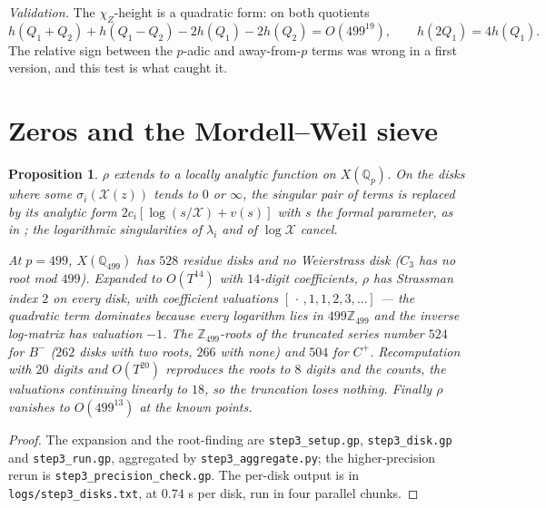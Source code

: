 \documentclass[11pt,reqno]{amsart}
\theoremstyle{plain}
\newtheorem{proposition}[theorem]{Proposition}
\theoremstyle{definition}
\newcommand{\Q}{\mathbb{Q}}
\newcommand{\Z}{\mathbb{Z}}
\numberwithin{equation}{section}
\begin{document}
\emph{Validation.} The $\chi_{Z}$-height is a quadratic form: on both quotients
\[
  h(Q_{1}+Q_{2})+h(Q_{1}-Q_{2})-2h(Q_{1})-2h(Q_{2})=O(499^{19}),
  \qquad h(2Q_{1})=4h(Q_{1}).
\]
The relative sign between the $p$-adic and away-from-$p$ terms was wrong in a
first version, and this test is what caught it.

\section{Zeros and the Mordell--Weil sieve}\label{sec:sieve}

\begin{proposition}\label{prop:zeros}
$\rho$ extends to a locally analytic function on $X(\Q_{p})$. On the disks where
some $\sigma_{i}(\mathcal{X}(z))$ tends to $0$ or $\infty$, the singular pair of
terms is replaced by its analytic form $2c_{i}[\log(s/\mathcal{X})+v(s)]$ with
$s$ the formal parameter, as in \cite[Rem.~2.5]{BianchiPadurariu}; the
logarithmic singularities of $\lambda_{i}$ and of $\log\mathcal{X}$ cancel.

At $p=499$, $X(\Q_{499})$ has $528$ residue disks and no Weierstrass disk
($C_{3}$ has no root mod $499$). Expanded to $O(T^{14})$ with $14$-digit
coefficients, $\rho$ has Strassman index $2$ on every disk, with coefficient
valuations $[\,\cdot\,,1,1,2,3,\dots]$ --- the quadratic term dominates because
every logarithm lies in $499\Z_{499}$ and the inverse log-matrix has valuation
$-1$. The $\Z_{499}$-roots of the truncated series number $524$ for $B^{-}$
($262$ disks with two roots, $266$ with none) and $504$ for $C^{+}$.
Recomputation with $20$ digits and $O(T^{20})$ reproduces the roots to $8$
digits and the counts, the valuations continuing linearly to $18$, so the
truncation loses nothing. Finally $\rho$ vanishes to $O(499^{13})$ at the known
points.
\end{proposition}

\begin{proof}
The expansion and the root-finding are \texttt{step3\_setup.gp},
\texttt{step3\_disk.gp} and \texttt{step3\_run.gp}, aggregated by
\texttt{step3\_aggregate.py}; the higher-precision rerun is
\texttt{step3\_\allowbreak precision\_check.gp}. The per-disk output is in
\texttt{logs/\allowbreak step3\_disks.txt}, at $0.74$ s per disk, run in four
parallel chunks.
\end{proof}
\end{document}
